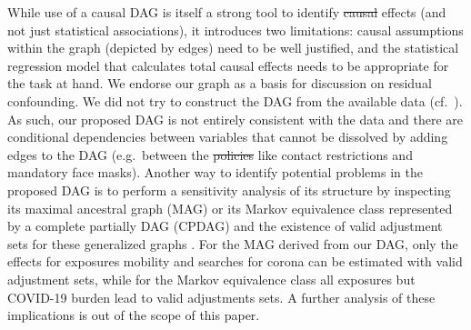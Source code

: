 \documentclass[10pt,letterpaper]{article}
\providecommand{\DIFaddtex}[1]{{\protect\color{blue}\uwave{#1}}} %
\providecommand{\DIFdeltex}[1]{{\protect\color{red}\sout{#1}}}                      %
\providecommand{\DIFaddbegin}{} %
\providecommand{\DIFaddend}{} %
\providecommand{\DIFdelbegin}{} %
\providecommand{\DIFdelend}{} %
\providecommand{\DIFadd}[1]{\texorpdfstring{\DIFaddtex{#1}}{#1}} %
\providecommand{\DIFdel}[1]{\texorpdfstring{\DIFdeltex{#1}}{}} %
\newcommand{\DIFscaledelfig}{0.5}
\newlength{\DIFdelgraphicswidth} %
\newlength{\DIFdelgraphicsheight} %
\newcommand{\DIFaddincludegraphics}[2][]{{\color{blue}\fbox{\DIFOincludegraphics[#1]{#2}}}} %
\newcommand{\DIFdelincludegraphics}[2][]{%
\sbox{\DIFdelgraphicsbox}{\DIFOincludegraphics[#1]{#2}}%
\settoboxwidth{\DIFdelgraphicswidth}{\DIFdelgraphicsbox} %
\settoboxtotalheight{\DIFdelgraphicsheight}{\DIFdelgraphicsbox} %
\scalebox{\DIFscaledelfig}{%
\parbox[b]{\DIFdelgraphicswidth}{\usebox{\DIFdelgraphicsbox}\\[-\baselineskip] \rule{\DIFdelgraphicswidth}{0em}}\llap{\resizebox{\DIFdelgraphicswidth}{\DIFdelgraphicsheight}{%
\setlength{\unitlength}{\DIFdelgraphicswidth}%
\begin{picture}(1,1)%
\thicklines\linethickness{2pt} %
{\color[rgb]{1,0,0}\put(0,0){\framebox(1,1){}}}%
{\color[rgb]{1,0,0}\put(0,0){\line( 1,1){1}}}%
{\color[rgb]{1,0,0}\put(0,1){\line(1,-1){1}}}%
\end{picture}%
}\hspace*{3pt}}} %
} %
\DeclareRobustCommand{\DIFaddbegin}{\DIFOaddbegin \let\includegraphics\DIFaddincludegraphics} %
\DeclareRobustCommand{\DIFaddend}{\DIFOaddend \let\includegraphics\DIFOincludegraphics} %
\DeclareRobustCommand{\DIFdelbegin}{\DIFOdelbegin \let\includegraphics\DIFdelincludegraphics} %
\DeclareRobustCommand{\DIFdelend}{\DIFOaddend \let\includegraphics\DIFOincludegraphics} %
\begin{document}
While use of a causal DAG is itself a strong tool to identify \DIFdelbegin \DIFdel{causal
}\DIFdelend \DIFaddbegin \emph{\DIFadd{causal}} \DIFaddend effects (and not just statistical associations), it introduces two limitations: causal assumptions within the graph (depicted by edges) need to be well justified, and the statistical regression model that calculates total causal effects needs to be appropriate for the task at hand. We endorse our graph as a basis for discussion on residual confounding. We did not try to construct the DAG from the available data (cf.~\cite{gencoglu2020causal}). As such, our proposed DAG is not entirely consistent with the data and there are conditional dependencies between variables that cannot be dissolved by adding edges to the DAG (e.g.~between the \DIFdelbegin \DIFdel{policies }\DIFdelend \DIFaddbegin \DIFadd{interventions }\DIFaddend like contact restrictions and mandatory face masks). Another way to identify potential problems in the proposed DAG is to perform a sensitivity analysis of its structure by inspecting its maximal ancestral graph (MAG) or its Markov equivalence class represented by a complete partially DAG (CPDAG) and the existence of valid adjustment sets for these generalized graphs \cite{perkovic2017complete}. For the MAG derived from our DAG, only the effects for exposures mobility and searches for corona can be estimated with valid adjustment sets, while for the Markov equivalence class all exposures but COVID-19 burden lead to valid adjustments sets. A further analysis of these implications is out of the scope of this paper.
\end{document}
